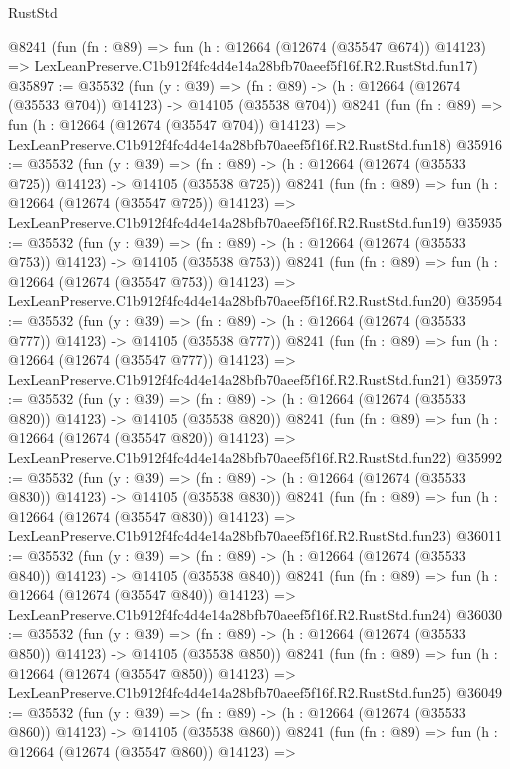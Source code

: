 \begin{lexlean}{RustStd}
\begin{coremodule}
    @8241
    (fun (fn : @89) =>
    fun (h : @12664 (@12674 (@35547 @674)) @14123) =>
    LexLeanPreserve.C1b912f4fc4d4e14a28bfb70aeef5f16f.R2.RustStd.fun17)
@35897 := @35532
    (fun (y : @39) =>
    (fn : @89) -> (h : @12664 (@12674 (@35533 @704)) @14123) -> @14105 (@35538 @704))
    @8241
    (fun (fn : @89) =>
    fun (h : @12664 (@12674 (@35547 @704)) @14123) =>
    LexLeanPreserve.C1b912f4fc4d4e14a28bfb70aeef5f16f.R2.RustStd.fun18)
@35916 := @35532
    (fun (y : @39) =>
    (fn : @89) -> (h : @12664 (@12674 (@35533 @725)) @14123) -> @14105 (@35538 @725))
    @8241
    (fun (fn : @89) =>
    fun (h : @12664 (@12674 (@35547 @725)) @14123) =>
    LexLeanPreserve.C1b912f4fc4d4e14a28bfb70aeef5f16f.R2.RustStd.fun19)
@35935 := @35532
    (fun (y : @39) =>
    (fn : @89) -> (h : @12664 (@12674 (@35533 @753)) @14123) -> @14105 (@35538 @753))
    @8241
    (fun (fn : @89) =>
    fun (h : @12664 (@12674 (@35547 @753)) @14123) =>
    LexLeanPreserve.C1b912f4fc4d4e14a28bfb70aeef5f16f.R2.RustStd.fun20)
@35954 := @35532
    (fun (y : @39) =>
    (fn : @89) -> (h : @12664 (@12674 (@35533 @777)) @14123) -> @14105 (@35538 @777))
    @8241
    (fun (fn : @89) =>
    fun (h : @12664 (@12674 (@35547 @777)) @14123) =>
    LexLeanPreserve.C1b912f4fc4d4e14a28bfb70aeef5f16f.R2.RustStd.fun21)
@35973 := @35532
    (fun (y : @39) =>
    (fn : @89) -> (h : @12664 (@12674 (@35533 @820)) @14123) -> @14105 (@35538 @820))
    @8241
    (fun (fn : @89) =>
    fun (h : @12664 (@12674 (@35547 @820)) @14123) =>
    LexLeanPreserve.C1b912f4fc4d4e14a28bfb70aeef5f16f.R2.RustStd.fun22)
@35992 := @35532
    (fun (y : @39) =>
    (fn : @89) -> (h : @12664 (@12674 (@35533 @830)) @14123) -> @14105 (@35538 @830))
    @8241
    (fun (fn : @89) =>
    fun (h : @12664 (@12674 (@35547 @830)) @14123) =>
    LexLeanPreserve.C1b912f4fc4d4e14a28bfb70aeef5f16f.R2.RustStd.fun23)
@36011 := @35532
    (fun (y : @39) =>
    (fn : @89) -> (h : @12664 (@12674 (@35533 @840)) @14123) -> @14105 (@35538 @840))
    @8241
    (fun (fn : @89) =>
    fun (h : @12664 (@12674 (@35547 @840)) @14123) =>
    LexLeanPreserve.C1b912f4fc4d4e14a28bfb70aeef5f16f.R2.RustStd.fun24)
@36030 := @35532
    (fun (y : @39) =>
    (fn : @89) -> (h : @12664 (@12674 (@35533 @850)) @14123) -> @14105 (@35538 @850))
    @8241
    (fun (fn : @89) =>
    fun (h : @12664 (@12674 (@35547 @850)) @14123) =>
    LexLeanPreserve.C1b912f4fc4d4e14a28bfb70aeef5f16f.R2.RustStd.fun25)
@36049 := @35532
    (fun (y : @39) =>
    (fn : @89) -> (h : @12664 (@12674 (@35533 @860)) @14123) -> @14105 (@35538 @860))
    @8241
    (fun (fn : @89) =>
    fun (h : @12664 (@12674 (@35547 @860)) @14123) =>

\end{coremodule}
\end{lexlean}
